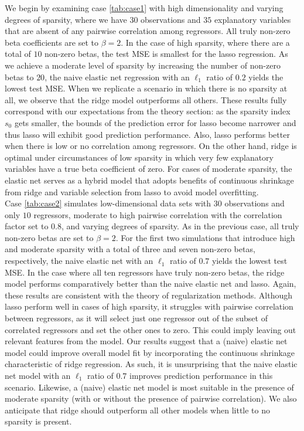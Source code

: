 \noindent We begin by examining case \ref{tab:case1} with high dimensionality and varying degrees of sparsity, where we have $30$ observations and $35$ explanatory variables that are absent of any pairwise correlation among regressors. All truly non-zero beta coefficients are set to $\beta=2$. In the case of high sparsity, where there are a total of $10$ non-zero betas, the test MSE is smallest for the lasso regression. As we achieve a moderate level of sparsity by increasing the number of non-zero betas to $20$, the naive elastic net regression with an $\ell_1$ ratio of $0.2$ yields the lowest test MSE. When we replicate a scenario in which there is no sparsity at all, we observe that the ridge model outperforms all others. These results fully correspond with our expectations from the theory section: as the sparsity index $s_0$ gets smaller, the bounds of the prediction error for lasso become narrower and thus lasso will exhibit good prediction performance. Also, lasso performs better when there is low or no correlation among regressors. On the other hand, ridge is optimal under circumstances of low sparsity in which very few explanatory variables have a true beta coefficient of zero. For cases of moderate sparsity, the elastic net serves as a hybrid model that adopts benefits of continuous shrinkage from ridge and variable selection from lasso to avoid model overfitting. \\  

\noindent Case \ref{tab:case2} simulates low-dimensional data sets with $30$ observations and only $10$ regressors, moderate to high pairwise correlation with the correlation factor set to $0.8$, and varying degrees of sparsity. As in the previous case, all truly non-zero betas are set to $\beta=2$. For the first two simulations that introduce high and moderate sparsity with a total of three and seven non-zero betas, respectively, the naive elastic net with an $\ell_1$ ratio of $0.7$ yields the lowest test MSE. In the case where all ten regressors have truly non-zero betas, the ridge model performs comparatively better than the naive elastic net and lasso. Again, these results are consistent with the theory of regularization methods. Although lasso perform well in cases of high sparsity, it struggles with pairwise correlation between regressors, as it will select just one regressor out of the subset of correlated regressors and set the other ones to zero. This could imply leaving out relevant features from the model. Our results suggest that a (naive) elastic net model could improve overall model fit by incorporating the continuous shrinkage characteristic of ridge regression. As such, it is unsurprising that the naive elastic net model with an $\ell_1$ ratio of $0.7$ improves prediction performance in this scenario. Likewise, a (naive) elastic net model is most suitable in the presence of moderate sparsity (with or without the presence of pairwise correlation). We also anticipate that ridge should outperform all other models when little to no sparsity is present.          \\


